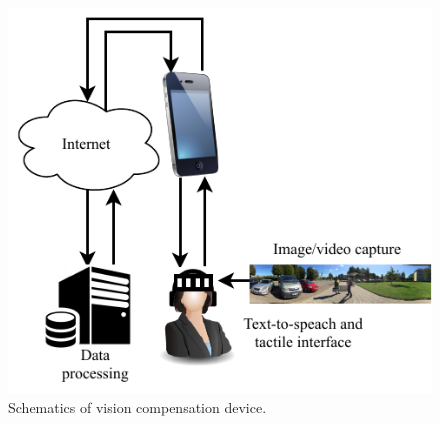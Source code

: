 \documentclass[10pt,conference,compsocconf]{IEEEtran}
\begin{document}
\begin{figure}
  \begin{center}
    \includegraphics[scale=0.7]{./img/cropped_diagram.pdf}  
  \end{center}
  \caption{Schematics of vision compensation device.}
  \label{fig:schematics}
\end{figure}





\end{document}
